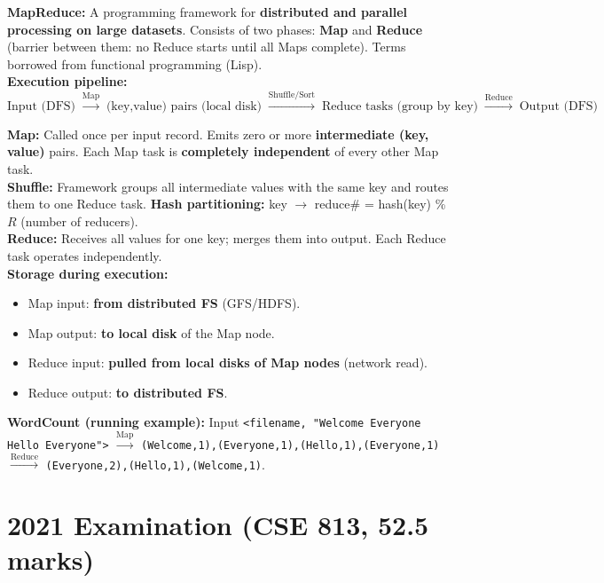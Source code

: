 \documentclass[12pt, a4paper]{article}
\newenvironment{solbox}{\begin{mdframed}[style=solframe]}{\end{mdframed}}
\begin{document}
\begin{solbox}
\textbf{MapReduce:} A programming framework for \textbf{distributed and parallel processing on
large datasets}. Consists of two phases: \textbf{Map} and \textbf{Reduce} (barrier between them:
no Reduce starts until all Maps complete). Terms borrowed from functional programming (Lisp).\\[6pt]

\textbf{Execution pipeline:}
\[
\text{Input (DFS)} \;\xrightarrow{\text{Map}}\; \text{(key,value) pairs (local disk)}
\;\xrightarrow{\text{Shuffle/Sort}}\; \text{Reduce tasks (group by key)}
\;\xrightarrow{\text{Reduce}}\; \text{Output (DFS)}
\]

\textbf{Map:} Called once per input record. Emits zero or more \textbf{intermediate (key, value)}
pairs. Each Map task is \textbf{completely independent} of every other Map task.\\
\textbf{Shuffle:} Framework groups all intermediate values with the same key and routes them to
one Reduce task. \textbf{Hash partitioning:} key $\rightarrow$ reduce\# = hash(key) \% $R$
(number of reducers).\\
\textbf{Reduce:} Receives all values for one key; merges them into output. Each Reduce task
operates independently.\\[6pt]

\textbf{Storage during execution:}
\begin{itemize}[leftmargin=1.4cm, itemsep=1pt]
  \item Map input: \textbf{from distributed FS} (GFS/HDFS).
  \item Map output: \textbf{to local disk} of the Map node.
  \item Reduce input: \textbf{pulled from local disks of Map nodes} (network read).
  \item Reduce output: \textbf{to distributed FS}.
\end{itemize}

\textbf{WordCount (running example):} Input \texttt{<filename, "Welcome Everyone Hello Everyone">}
$\xrightarrow{\text{Map}}$ \texttt{(Welcome,1),(Everyone,1),(Hello,1),(Everyone,1)}
$\xrightarrow{\text{Reduce}}$ \texttt{(Everyone,2),(Hello,1),(Welcome,1)}.
\end{solbox}

\section{2021 Examination (CSE 813, 52.5 marks)}
\end{document}

